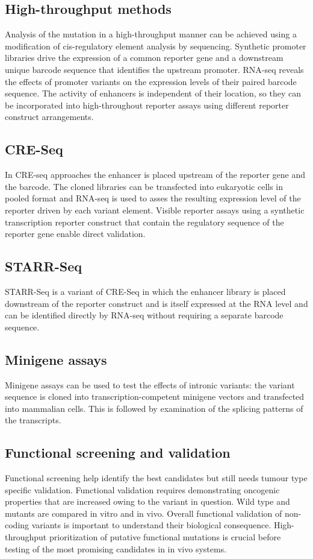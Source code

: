	\subsection{High-throughput methods}
	Analysis of the mutation in a high-throughput manner can be achieved using a modification of cis-regulatory element analysis by sequencing.
	Synthetic promoter libraries drive the expression of a common reporter gene and a downstream unique barcode sequence that identifies the upstream promoter.
	RNA-seq reveals the effects of promoter variants on the expression levels of their paired barcode sequence.
	The activity of enhancers is independent of their location, so they can be incorporated into high-throughout reporter assays using different reporter construct arrangements.

	\subsection{CRE-Seq}
	In CRE-seq approaches the enhancer is placed upstream of the reporter gene and the barcode.
	The cloned libraries can be transfected into eukaryotic cells in pooled format and RNA-seq is used to asses the resulting expression level of the reporter driven by each variant element.
	Visible reporter assays using a synthetic transcription reporter construct that contain the regulatory sequence of the reporter gene enable direct validation.

	\subsection{STARR-Seq}
	STARR-Seq is a variant of CRE-Seq in which the enhancer library is placed downstream of the reporter construct and is itself expressed at the RNA level and can be identified directly by RNA-seq without requiring a separate barcode sequence.

	\subsection{Minigene assays}
	Minigene assays can be used to test the effects of intronic variants: the variant sequence is cloned into transcription-competent minigene vectors and transfected into mammalian cells.
	This is followed by examination of the splicing patterns of the transcripts.

	\subsection{Functional screening and validation}
	Functional screening help identify the best candidates  but still needs tumour type specific validation.
	Functional validation requires demonstrating oncogenic properties that are increased owing to the variant in question.
	Wild type and mutants are compared in vitro and in vivo.
	Overall functional validation of non-coding variants is important to understand their biological consequence.
	High-throughput prioritization of putative functional mutations is crucial before testing of the most promising candidates in in vivo systems.
